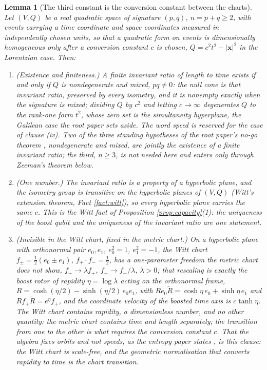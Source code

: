 \documentclass[11pt]{article}
\newtheorem{lemma}[theorem]{Lemma}
\theoremstyle{definition}
\begin{document}
\begin{lemma}[The third constant is the conversion constant between the charts]\label{lem:speed}
Let $(V, Q)$ be a real quadratic space of signature $(p, q)$, $n = p + q \geq 2$, with events carrying a time coordinate and space coordinates measured in independently chosen units, so that a quadratic form on events is dimensionally homogeneous only after a conversion constant $c$ is chosen, $Q = c^{2}t^{2} - |\mathbf{x}|^{2}$ in the Lorentzian case. Then:
\begin{enumerate}
\item[(i)] \emph{(Existence and finiteness.)} A finite invariant ratio of length to time exists if and only if $Q$ is nondegenerate and mixed, $pq \neq 0$: the null cone is that invariant ratio, preserved by every isometry, and it is nonempty exactly when the signature is mixed; dividing $Q$ by $c^{2}$ and letting $c \to \infty$ degenerates $Q$ to the rank-one form $t^{2}$, whose zero set is the simultaneity hyperplane, the Galilean case the root paper sets aside. The word \emph{speed} is reserved for the case of clause (iv). Two of the three standing hypotheses of the root paper's no-go theorem \cite[Thm.~4.2]{ButlerT1}, nondegenerate and mixed, are jointly the existence of a finite invariant ratio; the third, $n \geq 3$, is not needed here and enters only through Zeeman's theorem below.
\item[(ii)] \emph{(One number.)} The invariant ratio is a property of a hyperbolic plane, and the isometry group is transitive on the hyperbolic planes of $(V, Q)$ (Witt's extension theorem, Fact \ref{fact:witt}), so every hyperbolic plane carries the same $c$. This is the Witt fact of Proposition \ref{prop:capacity}(1): the uniqueness of the boost qubit and the uniqueness of the invariant ratio are one statement.
\item[(iii)] \emph{(Invisible in the Witt chart, fixed in the metric chart.)} On a hyperbolic plane with orthonormal pair $e_{0}, e_{1}$, $e_{0}^{2} = 1$, $e_{1}^{2} = -1$, the Witt chart $f_{\pm} = \tfrac12(e_{0} \pm e_{1})$, $f_{+} \cdot f_{-} = \tfrac12$, has a one-parameter freedom the metric chart does not show, $f_{+} \to \lambda f_{+}$, $f_{-} \to f_{-}/\lambda$, $\lambda > 0$; that rescaling is exactly the boost rotor of rapidity $\eta = \log\lambda$ acting on the orthonormal frame, $R = \cosh(\eta/2) - \sinh(\eta/2)\,e_{0}e_{1}$, with $R e_{0}\tilde{R} = \cosh\eta\, e_{0} + \sinh\eta\, e_{1}$ and $R f_{+}\tilde{R} = e^{\eta}f_{+}$, and the coordinate velocity of the boosted time axis is $c\tanh\eta$. The Witt chart contains rapidity, a dimensionless number, and no other quantity; the metric chart contains time and length separately; the transition from one to the other is what requires the conversion constant $c$. That the algebra fixes orbits and not speeds, as the entropy paper states \cite[Fact~2.2]{ButlerT8}, is this clause: the Witt chart is scale-free, and the geometric normalisation that converts rapidity to time is the chart transition.

\end{enumerate}
\end{lemma}
\end{document}
